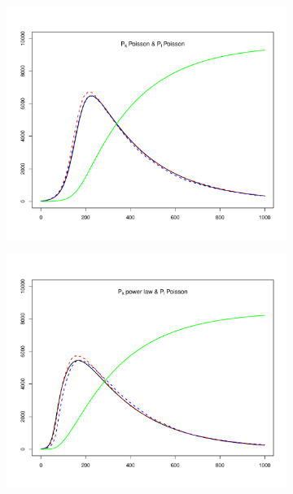 \begin{figure}[hbtp]
    \centering
    \begin{subfigure}[b]{0.45\textwidth}
        \centering
          \includegraphics[width=\textwidth, trim=30 20 30 20, clip]{../img/sir_00.pdf}
    \end{subfigure}
    \hspace{0.08\textwidth}
    \begin{subfigure}[b]{0.45\textwidth}
        \centering
          \includegraphics[width=\textwidth, trim=30 20 30 20, clip]{../img/sir_10.pdf}

\end{subfigure}
\end{figure}
